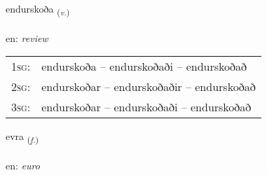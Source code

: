 \documentclass[frontgrid, backgrid]{flacards}\usepackage[]{graphicx}\usepackage[]{color}
\begin{document}
\renewcommand{\blhead}{\vskip5pt {\small\bfseries\footnotesize Sagnorð | Verb }}
\renewcommand{\bcfoot}{\vskip5pt \hspace{2pt}{\small\bfseries\footnotesize 2K}}


{endurskoða \small{\textsubscript{(\textit{v.})}} \\[1ex] %
 \\
en: \emph{review} \\  [2ex]
\renewcommand*{\arraystretch}{0.8}
\begin{tabular}{p{1cm}l}
\textsc{1sg}: & endurskoða -- endurskoðaði -- endurskoðað \\ 
\textsc{2sg}: & endurskoðar -- endurskoðaðir -- endurskoðað \\ 
\textsc{3sg}: & endurskoðar -- endurskoðaði -- endurskoðað \\ 
\end{tabular}
}

\renewcommand{\flhead}{\vskip5pt \fboxsep=0pt {\small\bfseries\footnotesize Nafnorð | Noun}}
\renewcommand{\fcfoot}{\vskip5pt \fboxsep=0pt \hspace{2pt}{\small\bfseries\footnotesize 2K}}

\renewcommand{\blhead}{\vskip5pt {\small\bfseries\footnotesize Nafnorð | Noun }}
\renewcommand{\bcfoot}{\vskip5pt \hspace{2pt}{\small\bfseries\footnotesize 2K}}


{evra \small{\textsubscript{(\textit{f.})}} \\[1ex] %
\textphonetic{[ɛvra]} \\
en: \emph{euro} \\  [2ex]
\renewcommand*{\arraystretch}{0.8}
}
\end{document}
